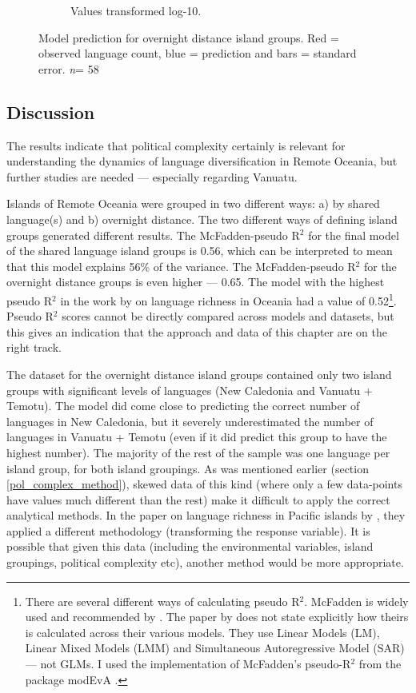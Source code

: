 \documentclass[a4paper,10pt]{article} %
\begin{document}
\begin{figure}
\begin{subfigure}{12cm}
\caption{Values transformed log-10.}
    \end{subfigure}
\caption[Model prediction for overnight distance island groups.]{{Model prediction for overnight distance island groups. Red = observed language count, blue = prediction and bars = standard error. \emph{n}= 58}}
\label{Marck_model_predict}
\end{figure}


\subsection{Discussion}
\label{pol_chapter_discisson}
The results indicate that political complexity certainly is relevant for understanding the dynamics of language diversification in Remote Oceania, but further studies are needed --- especially regarding Vanuatu.

Islands of Remote Oceania were grouped in two different ways: a) by shared language(s) and b) overnight distance. The two different ways of defining island groups generated different results. The McFadden-pseudo R$^2$ \citep{mcfadden1974frontiers} for the final model of the shared language island groups is 0.56, which can be interpreted to mean that this model explains 56\% of the variance. The McFadden-pseudo R$^2$ for the overnight distance groups is even higher ---  0.65. The model with the highest pseudo R$^2$ in the work by \citet{gavin2012island} on language richness in Oceania had a value of 0.52\footnote{There are several different ways of calculating pseudo R$^2$. McFadden is widely used and recommended by \citet{allison2014measures}. The paper by \citet{gavin2012island} does not state explicitly how theirs is calculated across their various models. They use Linear Models (LM), Linear Mixed Models (LMM) and Simultaneous Autoregressive Model (SAR) --- not GLMs. I used the implementation of McFadden's pseudo-R$^2$ from the package modEvA \citep{barbosa2016package}.}. Pseudo R$^2$ scores cannot be directly compared across models and datasets, but this gives an indication that the approach and data of this chapter are on the right track.

The dataset for the overnight distance island groups contained only two island groups with significant levels of languages (New Caledonia and Vanuatu + Temotu). The model did come close to predicting the correct number of languages in New Caledonia, but it severely underestimated the number of languages in Vanuatu + Temotu (even if it did predict this group to have the highest number). The majority of the rest of the sample was one language per island group, for both island groupings. As was mentioned earlier (section \ref{pol_complex_method}), skewed data of this kind (where only a few data-points have values much different than the rest) make it difficult to apply the correct analytical methods. In the paper on language richness in Pacific islands by \cite{gavin2012island}, they applied a different methodology (transforming the response variable). It is possible that given this data (including the environmental variables, island groupings, political complexity etc), another method would be more appropriate.
\end{document}
